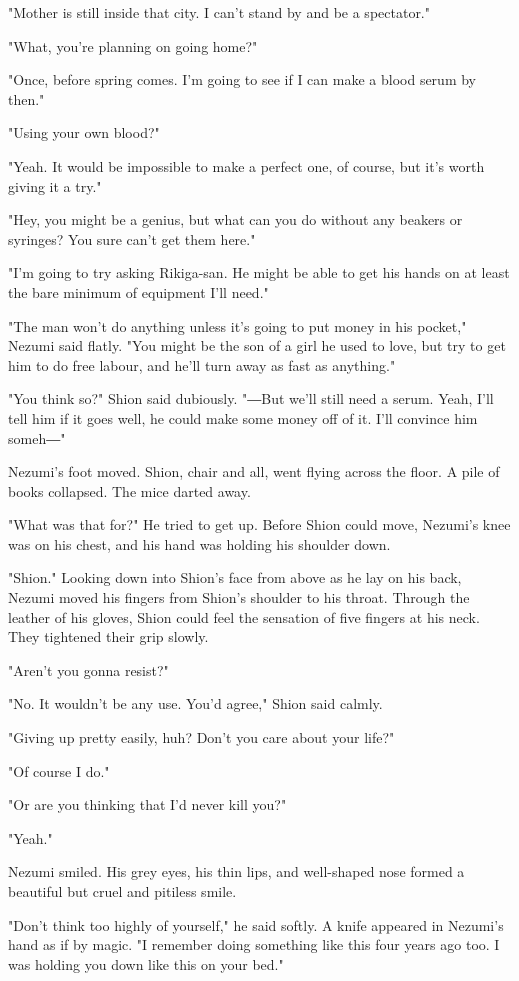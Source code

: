 "Mother is still inside that city. I can't stand by and be a spectator."

"What, you're planning on going home?"

"Once, before spring comes. I'm going to see if I can make a blood serum
by then."

"Using your own blood?"

"Yeah. It would be impossible to make a perfect one, of course, but it's
worth giving it a try."

"Hey, you might be a genius, but what can you do without any beakers or
syringes? You sure can't get them here."

"I'm going to try asking Rikiga-san. He might be able to get his hands
on at least the bare minimum of equipment I'll need."

"The man won't do anything unless it's going to put money in his
pocket," Nezumi said flatly. "You might be the son of a girl he used to
love, but try to get him to do free labour, and he'll turn away as fast
as anything."

"You think so?" Shion said dubiously. "―But we'll still need a serum.
Yeah, I'll tell him if it goes well, he could make some money off of it.
I'll convince him someh―"

Nezumi's foot moved. Shion, chair and all, went flying across the floor.
A pile of books collapsed. The mice darted away.

"What was that for?" He tried to get up. Before Shion could move,
Nezumi's knee was on his chest, and his hand was holding his shoulder
down.

"Shion." Looking down into Shion's face from above as he lay on his
back, Nezumi moved his fingers from Shion's shoulder to his throat.
Through the leather of his gloves, Shion could feel the sensation of
five fingers at his neck. They tightened their grip slowly.

"Aren't you gonna resist?"

"No. It wouldn't be any use. You'd agree," Shion said calmly.

"Giving up pretty easily, huh? Don't you care about your life?"

"Of course I do."

"Or are you thinking that I'd never kill you?"

"Yeah."

Nezumi smiled. His grey eyes, his thin lips, and well-shaped nose formed
a beautiful but cruel and pitiless smile.

"Don't think too highly of yourself," he said softly. A knife appeared
in Nezumi's hand as if by magic. "I remember doing something like this
four years ago too. I was holding you down like this on your bed."

